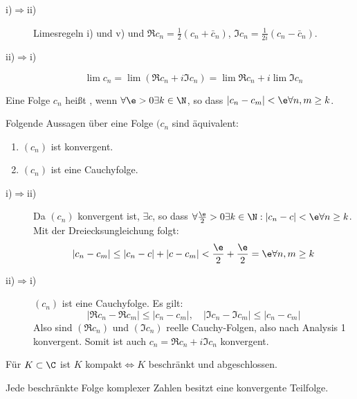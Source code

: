 \begin{beweis}
\begin{description}
\item[i)$ \Rightarrow $ii)] Limesregeln i) und v) und $ \Re c_n=\frac{1}{2}(c_n+\bar c_n) $, $ \Im c_n=\frac{1}{2i}(c_n-\bar c_n) $.
\item[ii)$ \Rightarrow $i)] \[ \lim c_n=\lim(\Re c_n+i\Im c_n)=\lim\Re c_n+i\lim\Im c_n \]
\end{description}
\end{beweis}
\begin{definition}
Eine Folge $ c_n $ hei\ss t , wenn $ \forall\e>0\exists k\in\N $, so dass $ |c_n-c_m|<\e\forall n,m\geq k $.
\end{definition}
\begin{satz}
Folgende Aussagen \"uber eine Folge $ (c_n $ sind \"aquivalent:
\begin{enumerate}
\item $ (c_n) $ ist konvergent.
\item $ (c_n) $ ist eine Cauchyfolge.
\end{enumerate}
\end{satz}
\begin{beweis}
\begin{description}
\item[i)$ \Rightarrow $ii)] Da $ (c_n) $ konvergent ist, $ \exists c $, so dass $ \forall\frac{\e}{2}>0\exists k\in\N:|c_n-c|<\e\forall n\geq k $. Mit der Dreiecksungleichung folgt:
\[ |c_n-c_m|\leq|c_n-c|+|c-c_m|<\frac{\e}{2}+\frac{\e}{2}=\e\forall n,m\geq k \]
\item[ii)$ \Rightarrow $i)] $ (c_n) $ ist eine Cauchyfolge. Es gilt:
\[ |\Re c_n-\Re c_m|\leq|c_n-c_m|,\quad |\Im c_n-\Im c_m|\leq|c_n-c_m| \]
Also sind $ (\Re c_n) $ und $ (\Im c_n) $ reelle Cauchy-Folgen, also nach Analysis 1 konvergent. Somit ist auch $ c_n=\Re c_n+i\Im c_n $ konvergent.
\end{description}
\end{beweis}
\begin{satz}
F\"ur $ K\subset\C $ ist $ K $ kompakt$ \Leftrightarrow K$ beschr\"ankt und abgeschlossen.
\end{satz}
\begin{satz}
Jede beschr\"ankte Folge komplexer Zahlen besitzt eine konvergente Teilfolge.
\end{satz}